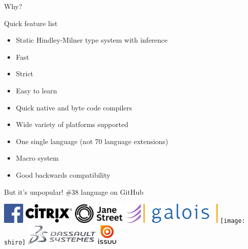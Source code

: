 \documentclass{beamer}
\begin{document}
\begin{frame}{}
  \center
  \fontsize{70}{70} \exclaim Why?
\end{frame}

\begin{frame}{Quick feature list}
  \begin{itemize}
    \item Static Hindley-Milner type system with inference
    \item Fast
    \item Strict
    \item Easy to learn
    \item Quick native and byte code compilers
    \item Wide variety of platforms supported
    \item One single language (not 70 language extensions)
    \item Macro system
    \item Good backwards compatibility
  \end{itemize}
\end{frame}

\begin{frame}{But it's unpopular!}
  \#38 language on GitHub

  \includegraphics[height=1cm]{facebook}
  \includegraphics[height=1cm]{citrix}
  \includegraphics[height=1cm]{janestreet}
  \includegraphics[height=1cm]{esper}
  \includegraphics[height=1cm]{galois}
  \texttt{[image: shiro]}
  \includegraphics[height=1cm]{ds}
  \includegraphics[height=1cm]{issuu}
\end{frame}
\end{document}
